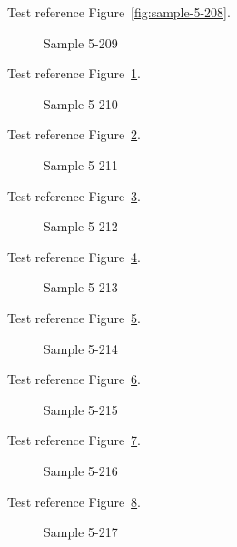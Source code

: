 Test reference Figure~\ref{fig:sample-5-208}.

\begin{figure}[tbhp]
\caption{Sample 5-209}
\label{fig:sample-5-209}
\end{figure}

Test reference Figure~\ref{fig:sample-5-209}.

\begin{figure}[tbhp]
\caption{Sample 5-210}
\label{fig:sample-5-210}
\end{figure}

Test reference Figure~\ref{fig:sample-5-210}.

\begin{figure}[tbhp]
\caption{Sample 5-211}
\label{fig:sample-5-211}
\end{figure}

Test reference Figure~\ref{fig:sample-5-211}.

\begin{figure}[tbhp]
\caption{Sample 5-212}
\label{fig:sample-5-212}
\end{figure}

Test reference Figure~\ref{fig:sample-5-212}.

\begin{figure}[tbhp]
\caption{Sample 5-213}
\label{fig:sample-5-213}
\end{figure}

Test reference Figure~\ref{fig:sample-5-213}.

\begin{figure}[tbhp]
\caption{Sample 5-214}
\label{fig:sample-5-214}
\end{figure}

Test reference Figure~\ref{fig:sample-5-214}.

\begin{figure}[tbhp]
\caption{Sample 5-215}
\label{fig:sample-5-215}
\end{figure}

Test reference Figure~\ref{fig:sample-5-215}.

\begin{figure}[tbhp]
\caption{Sample 5-216}
\label{fig:sample-5-216}
\end{figure}

Test reference Figure~\ref{fig:sample-5-216}.

\begin{figure}[tbhp]
\caption{Sample 5-217}
\label{fig:sample-5-217}
\end{figure}

